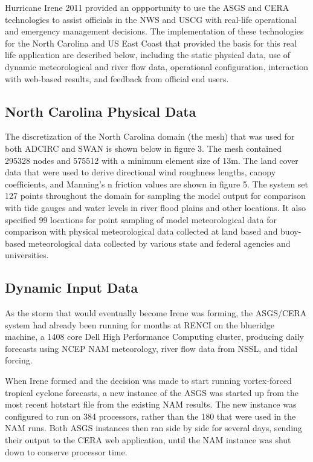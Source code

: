 \documentclass[12pt]{article}
\begin{document}
Hurricane Irene 2011 provided an oppportunity to use the ASGS and 
CERA technologies to assist officials in the NWS and USCG with 
real-life operational and emergency management decisions. The 
implementation of these technologies for the North Carolina and US 
East Coast that provided the basis for this real life application 
are described below, including the static physical data, use of 
dynamic meteorological and river flow data, operational 
configuration, interaction with web-based results, and feedback from 
official end users. 

\subsection{North Carolina Physical Data}

The discretization of the North Carolina domain (the mesh) that was 
used for both ADCIRC and SWAN is shown below in figure 3. The mesh 
contained 295328 nodes and 575512 with a minimum element size of 
13m. The land cover data that were used to derive directional wind 
roughness lengths, canopy coefficients, and Manning's n friction 
values are shown in figure 5. The system set 127 points throughout 
the domain for sampling the model output for comparison with tide 
gauges and water levels in river flood plains and other locations. 
It also specified 99 locations for point sampling of model 
meteorological data for comparison with physical meteorological data 
collected at land based and buoy-based meteorological data collected 
by various state and federal agencies and universities.

\subsection{Dynamic Input Data}

As the storm that would eventually become Irene was forming, the 
ASGS/CERA system had already been running for months at RENCI on the 
blueridge machine, a 1408 core Dell High Performance Computing 
cluster, producing daily forecasts using NCEP NAM meteorology, river 
flow data from NSSL, and tidal forcing. 

When Irene formed and the decision was made to start running 
vortex-forced tropical cyclone forecasts, a new instance of the ASGS 
was started up from the most recent hotstart file from the existing 
NAM results. The new instance was configured to run on 384 
processors, rather than the 180 that were used in the NAM runs. Both 
ASGS instances then ran side by side for several days, sending their 
output to the CERA web application, until the NAM instance was shut 
down to conserve processor time.
\end{document}
